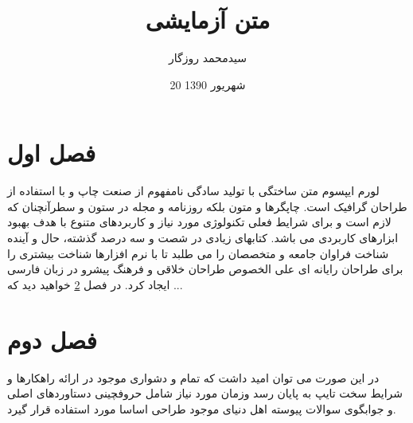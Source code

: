 \documentclass[11pt]{book}
\title{متن آزمایشی}
\author{سیدمحمد روزگار}
\date{20 شهریور 1390}
\begin{document}
	\maketitle

\chapter{فصل اول} \label{chapter1}
لورم ایپسوم متن ساختگی با تولید سادگی نامفهوم از صنعت چاپ و با استفاده از طراحان گرافیک است. چاپگرها و متون بلکه روزنامه و مجله در ستون و سطرآنچنان که لازم است و برای شرایط فعلی تکنولوژی مورد نیاز و کاربردهای متنوع با هدف بهبود ابزارهای کاربردی می باشد. کتابهای زیادی در شصت و سه درصد گذشته، حال و آینده شناخت فراوان جامعه و متخصصان را می طلبد تا با نرم افزارها شناخت بیشتری را برای طراحان رایانه ای علی الخصوص طراحان خلاقی و فرهنگ پیشرو در زبان فارسی ایجاد کرد. در فصل \hyperref[chapter2]{\ref{chapter2}} خواهید دید که ...

\chapter{فصل دوم} \label{chapter2}
در این صورت می توان امید داشت که تمام و دشواری موجود در ارائه راهکارها و شرایط سخت تایپ به پایان رسد وزمان مورد نیاز شامل حروفچینی دستاوردهای اصلی و جوابگوی سوالات پیوسته اهل دنیای موجود طراحی اساسا مورد استفاده قرار گیرد.
\end{document}
